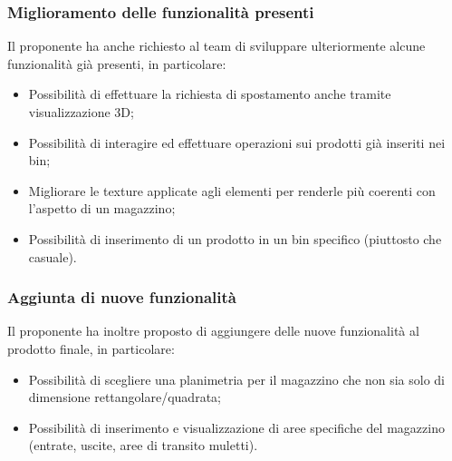 \subsubsection{Miglioramento delle funzionalità presenti}
Il proponente ha anche richiesto al team di sviluppare ulteriormente alcune funzionalità già presenti, in particolare:
\begin{itemize}
    \item Possibilità di effettuare la richiesta di spostamento anche tramite visualizzazione 3D;
    \item Possibilità di interagire ed effettuare operazioni sui prodotti già inseriti nei bin;
    \item Migliorare le texture applicate agli elementi per renderle più coerenti con l'aspetto di un magazzino;
    \item Possibilità di inserimento di un prodotto in un bin specifico (piuttosto che casuale).
\end{itemize}
\subsubsection{Aggiunta di nuove funzionalità}
Il proponente ha inoltre proposto di aggiungere delle nuove funzionalità al prodotto finale, in particolare:
\begin{itemize}    
    \item Possibilità di scegliere una planimetria per il magazzino che non sia solo di dimensione rettangolare/quadrata;
    \item Possibilità di inserimento e visualizzazione di aree specifiche del magazzino (entrate, uscite, aree di transito muletti).
\end{itemize}
